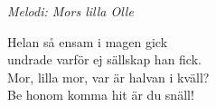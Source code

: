 {\footnotesize\textit{Melodi: Mors lilla Olle}}\par
\vspace{10pt}
Helan så ensam i magen gick\\
undrade varför ej sällskap han fick.\\
Mor, lilla mor, var är halvan i kväll?\\
Be honom komma hit är du snäll!